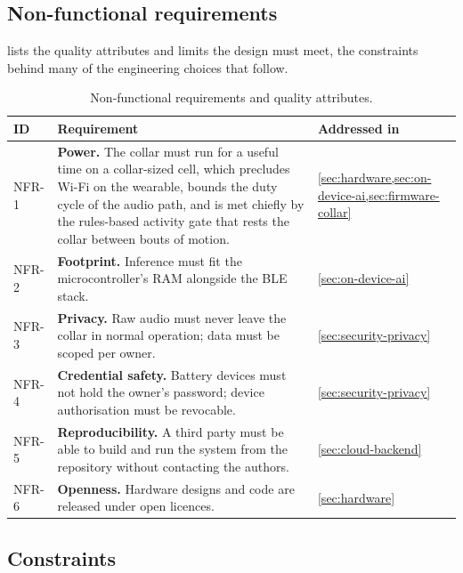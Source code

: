 \subsection{Non-functional requirements}

 lists the quality attributes and limits the design must meet, the constraints behind
many of the engineering choices that follow.

\begin{table}[ht]
  \centering
  \caption{Non-functional requirements and quality attributes.}
  \label{tab:nfr}
  \begin{tabularx}{\textwidth}{@{}l X l@{}}
    \toprule
    \textbf{ID} & \textbf{Requirement} & \textbf{Addressed in} \\
    \midrule
    NFR-1 & \textbf{Power.} The collar must run for a useful time on a collar-sized cell, which
            precludes Wi-Fi on the wearable, bounds the duty cycle of the audio path, and is met
            chiefly by the rules-based activity gate that rests the collar between bouts of motion. &
            \cref{sec:hardware,sec:on-device-ai,sec:firmware-collar} \\
    NFR-2 & \textbf{Footprint.} Inference must fit the microcontroller's RAM alongside the BLE stack. &
            \cref{sec:on-device-ai} \\
    NFR-3 & \textbf{Privacy.} Raw audio must never leave the collar in normal operation; data must be
            scoped per owner. & \cref{sec:security-privacy} \\
    NFR-4 & \textbf{Credential safety.} Battery devices must not hold the owner's password; device
            authorisation must be revocable. & \cref{sec:security-privacy} \\
    NFR-5 & \textbf{Reproducibility.} A third party must be able to build and run the system from the
            repository without contacting the authors. & \cref{sec:cloud-backend} \\
    NFR-6 & \textbf{Openness.} Hardware designs and code are released under open licences. &
            \cref{sec:hardware} \\
    \bottomrule
  \end{tabularx}
\end{table}

\subsection{Constraints}

